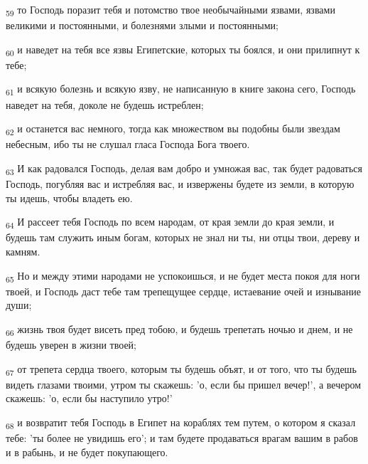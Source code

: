 \begin{tcolorbox}
\textsubscript{59} то Господь поразит тебя и потомство твое необычайными язвами, язвами великими и постоянными, и болезнями злыми и постоянными;
\end{tcolorbox}
\begin{tcolorbox}
\textsubscript{60} и наведет на тебя все язвы Египетские, которых ты боялся, и они прилипнут к тебе;
\end{tcolorbox}
\begin{tcolorbox}
\textsubscript{61} и всякую болезнь и всякую язву, не написанную в книге закона сего, Господь наведет на тебя, доколе не будешь истреблен;
\end{tcolorbox}
\begin{tcolorbox}
\textsubscript{62} и останется вас немного, тогда как множеством вы подобны были звездам небесным, ибо ты не слушал гласа Господа Бога твоего.
\end{tcolorbox}
\begin{tcolorbox}
\textsubscript{63} И как радовался Господь, делая вам добро и умножая вас, так будет радоваться Господь, погубляя вас и истребляя вас, и извержены будете из земли, в которую ты идешь, чтобы владеть ею.
\end{tcolorbox}
\begin{tcolorbox}
\textsubscript{64} И рассеет тебя Господь по всем народам, от края земли до края земли, и будешь там служить иным богам, которых не знал ни ты, ни отцы твои, дереву и камням.
\end{tcolorbox}
\begin{tcolorbox}
\textsubscript{65} Но и между этими народами не успокоишься, и не будет места покоя для ноги твоей, и Господь даст тебе там трепещущее сердце, истаевание очей и изнывание души;
\end{tcolorbox}
\begin{tcolorbox}
\textsubscript{66} жизнь твоя будет висеть пред тобою, и будешь трепетать ночью и днем, и не будешь уверен в жизни твоей;
\end{tcolorbox}
\begin{tcolorbox}
\textsubscript{67} от трепета сердца твоего, которым ты будешь объят, и от того, что ты будешь видеть глазами твоими, утром ты скажешь: 'о, если бы пришел вечер!', а вечером скажешь: 'о, если бы наступило утро!'
\end{tcolorbox}
\begin{tcolorbox}
\textsubscript{68} и возвратит тебя Господь в Египет на кораблях тем путем, о котором я сказал тебе: 'ты более не увидишь его'; и там будете продаваться врагам вашим в рабов и в рабынь, и не будет покупающего.
\end{tcolorbox}
